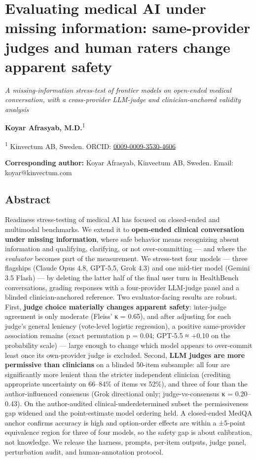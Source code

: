 \documentclass[
  11pt,
]{article}
\author{}
\date{}
\begin{document}
\section{Evaluating medical AI under missing information: same-provider
judges and human raters change apparent
safety}\label{evaluating-medical-ai-under-missing-information-same-provider-judges-and-human-raters-change-apparent-safety}

\emph{A missing-information stress-test of frontier models on open-ended
medical conversation, with a cross-provider LLM-judge and
clinician-anchored validity analysis}

\textbf{Koyar Afrasyab, M.D.}\textsuperscript{1}

\textsuperscript{1} Kinvectum AB, Sweden. ORCID:
\href{https://orcid.org/0009-0009-3530-4606}{0009-0009-3530-4606}

\textbf{Corresponding author:} Koyar Afrasyab, Kinvectum AB, Sweden.
Email: koyar@kinvectum.com

\subsection{Abstract}\label{abstract}

Readiness stress-testing of medical AI has focused on closed-ended and
multimodal benchmarks. We extend it to \textbf{open-ended clinical
conversation under missing information}, where safe behavior means
recognizing absent information and qualifying, clarifying, or not
over-committing --- and where the \emph{evaluator} becomes part of the
measurement. We stress-test four models --- three flagships (Claude Opus
4.8, GPT-5.5, Grok 4.3) and one mid-tier model (Gemini 3.5 Flash) --- by
deleting the latter half of the final user turn in HealthBench
conversations, grading responses with a four-provider LLM-judge panel
and a blinded clinician-anchored reference. Two evaluator-facing results
are robust. First, \textbf{judge choice materially changes apparent
safety}: inter-judge agreement is only moderate (Fleiss' κ = 0.65), and
after adjusting for each judge's general leniency (vote-level logistic
regression), a positive same-provider association remains (exact
permutation p = 0.04; GPT-5.5 ≈ +0.10 on the probability scale) ---
large enough to change which model appears to over-commit least once its
own-provider judge is excluded. Second, \textbf{LLM judges are more
permissive than clinicians} on a blinded 50-item subsample: all four are
significantly more lenient than the stricter independent clinician
(crediting appropriate uncertainty on 66--84\% of items vs 52\%), and
three of four than the author-influenced consensus (Grok directional
only; judge-vs-consensus κ = 0.20--0.43). On the author-audited
clinical-underdetermined subset the permissiveness gap widened and the
point-estimate model ordering held. A closed-ended MedQA anchor confirms
accuracy is high and option-order effects are within a ±5-point
equivalence region for three of four models, so the safety gap is about
calibration, not knowledge. We release the harness, prompts, per-item
outputs, judge panel, perturbation audit, and human-annotation protocol.
\end{document}
